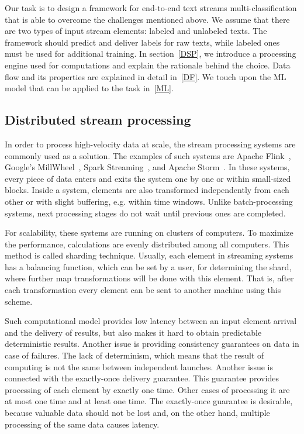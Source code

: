 
Our task is to design a framework for end-to-end text streams multi-classification that is able to overcome the challenges mentioned above. We assume that there are two types of input stream elements: labeled and unlabeled texts. The framework should predict and deliver labels for raw texts, while labeled ones must be used for additional training. In section~\ref{DSP}, we introduce a processing engine used for computations and explain the rationale behind the choice. Data flow and its properties are explained in detail in~\ref{DF}. We touch upon the ML model that can be applied to the task in~\ref{ML}.

\subsection{Distributed stream processing\label{DSP}}

In order to process high-velocity data at scale, the stream processing systems are commonly used as a solution. The examples of such systems are Apache Flink~\cite{Carbone:2017:SMA:3137765.3137777}, Google's MillWheel~\cite{Akidau:2013:MFS:2536222.2536229}, Spark Streaming~\cite{Zaharia:2012:DSE:2342763.2342773}, and Apache Storm~\cite{apache:storm}. In these systems, every piece of data enters and exits the system one by one or within small-sized blocks. Inside a system, elements are also transformed independently from each other or with slight buffering, e.g. within time windows. Unlike batch-processing systems, next processing stages do not wait until previous ones are completed. 

For scalability, these systems are running on clusters of computers. To maximize the performance, calculations are evenly distributed among all computers. This method is called sharding technique. Usually, each element in streaming systems has a balancing function, which can be set by a user, for determining the shard, where further map transformations will be done with this element. That is, after each transformation every element can be sent to another machine using this scheme.

Such computational model provides low latency between an input element arrival and the delivery of results, but also makes it hard to obtain predictable deterministic results. Another issue is providing consistency guarantees on data in case of failures. The lack of determinism, which means that the result of computing is not the same between independent launches. Another issue is connected with the exactly-once delivery guarantee. This guarantee provides processing of each element by exactly one time. Other cases of processing it are at most one time and at least one time. The exactly-once guarantee is desirable, because valuable data should not be lost and, on the other hand, multiple processing of the same data causes latency.

